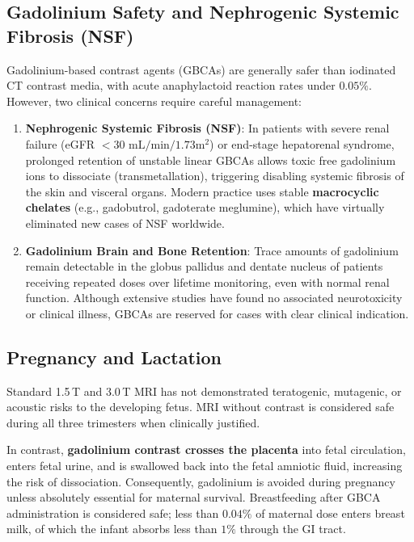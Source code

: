 \documentclass[11pt,a4paper]{article}
\begin{document}
\subsection{Gadolinium Safety and Nephrogenic Systemic Fibrosis (NSF)}
Gadolinium-based contrast agents (GBCAs) are generally safer than iodinated CT contrast media, with acute anaphylactoid reaction rates under $0.05\%$. However, two clinical concerns require careful management:
\begin{enumerate}
    \item \textbf{Nephrogenic Systemic Fibrosis (NSF)}: In patients with severe renal failure (eGFR $< 30\text{ mL/min}/1.73\text{m}^2$) or end-stage hepatorenal syndrome, prolonged retention of unstable linear GBCAs allows toxic free gadolinium ions to dissociate (transmetallation), triggering disabling systemic fibrosis of the skin and visceral organs. Modern practice uses stable \textbf{macrocyclic chelates} (e.g., gadobutrol, gadoterate meglumine), which have virtually eliminated new cases of NSF worldwide.
    \item \textbf{Gadolinium Brain and Bone Retention}: Trace amounts of gadolinium remain detectable in the globus pallidus and dentate nucleus of patients receiving repeated doses over lifetime monitoring, even with normal renal function. Although extensive studies have found no associated neurotoxicity or clinical illness, GBCAs are reserved for cases with clear clinical indication.
\end{enumerate}

\subsection{Pregnancy and Lactation}
Standard 1.5\,T and 3.0\,T MRI has not demonstrated teratogenic, mutagenic, or acoustic risks to the developing fetus. MRI without contrast is considered safe during all three trimesters when clinically justified.

In contrast, \textbf{gadolinium contrast crosses the placenta} into fetal circulation, enters fetal urine, and is swallowed back into the fetal amniotic fluid, increasing the risk of dissociation. Consequently, gadolinium is avoided during pregnancy unless absolutely essential for maternal survival. Breastfeeding after GBCA administration is considered safe; less than $0.04\%$ of maternal dose enters breast milk, of which the infant absorbs less than $1\%$ through the GI tract.

\end{document}
